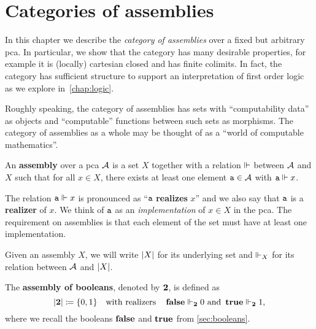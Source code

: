 \chapter{Categories of assemblies}\label{chap:assemblies}

In this chapter we describe the \emph{category of assemblies} over a fixed but
arbitrary pca.
%
In particular, we show that the category has many desirable properties, for
example it is (locally) cartesian closed and has finite colimits.
%
In fact, the category has sufficient structure to support an interpretation of
first order logic as we explore in~\cref{chap:logic}.

Roughly speaking, the category of assemblies has sets with ``computability
data'' as objects and ``computable'' functions between such sets as morphisms.
%
The category of assemblies as a whole may be thought of as a ``world of
computable mathematics''.

\begin{definition}[Assembly]
  An \textbf{assembly} over a pca \(\AA\) is a set \(X\) together with a
  relation \({\realizes}\) between \(\AA\) and \(X\) such that for all
  \(x \in X\), there exists at least one element \(\pca{a} \in \AA\) with
  \(\pca{a} \realizes x\).
\end{definition}

The relation \(\pca{a} \realizes x\) is pronounced as ``\(\pca{a}\)
\textbf{realizes} \(x\)'' and we also say that \(\pca{a}\) is a
\textbf{realizer} of \(x\). We think of \(\pca{a}\) as an \emph{implementation}
of \(x \in X\) in the pca.
%
The requirement on assemblies is that each element of the set must have at least
one implementation.

\begin{notation}
  Given an assembly \(X\), we will write \(\carrier{X}\) for its underlying set
  and \(\realizes_X\) for its relation between \(\AA\) and \(\carrier{X}\).
\end{notation}

\begin{example}\label{ex:assembly-of-booleans}
  The \textbf{assembly of booleans}, denoted by \(\Two\), is defined as
  \[
    \carrier{\Two} \coloneqq \set{0,1}
    \quad\text{with realizers}\quad
    \pcafalse \realizes_\Two 0
    \text{ and }%
    \pcatrue \realizes_\Two 1,
  \]
  where we recall the booleans \(\pcafalse\) and \(\pcatrue\) from \cref{sec:booleans}.
\end{example}

